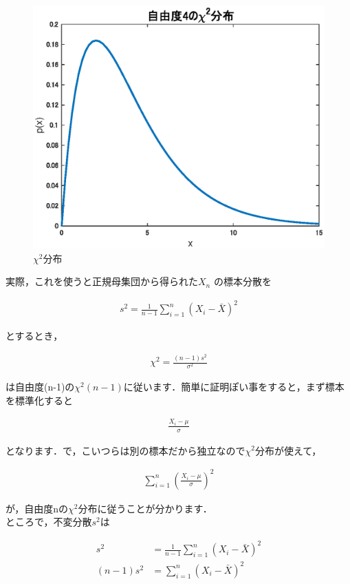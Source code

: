 \documentclass[11pt,a4paper]{ujreport} 	%
\begin{document}
\begin{figure}[H]
  \centering
  \includegraphics[width=12cm]{../figures/chi2.eps}
  \caption{$\chi^2$分布}
\end{figure}

実際，これを使うと正規母集団から得られた$X_n$
の標本分散を

\begin{align}
  s^2 = \frac{1}{n-1}\sum_{i=1}^n (X_i - \bar{X})^2
\end{align}

とするとき，

\begin{align}
  \chi^2 = \frac{(n-1)s^2}{\sigma^2}
\end{align}

は自由度(n-1)の$\chi^2(n-1)$に従います．簡単に証明ぽい事をすると，まず標本を標準化すると

\begin{align}
  \frac{X_i-\mu}{\sigma}
\end{align}

となります．で，こいつらは別の標本だから独立なので$\chi^2$分布が使えて，

\begin{align}
  \sum_{i=1}^n(\frac{X_i-\mu}{\sigma})^2
  \label{eq:normalgauss2}
\end{align}

が，自由度nの$\chi^2$分布に従うことが分かります．\\

ところで，不変分散$s^2$は

\begin{align}
  s^2 &= \frac{1}{n-1}\sum_{i=1}^n (X_i - \bar{X})^2\\
       (n-1)s^2 &= \sum_{i=1}^n (X_i - \bar{X})^2
      \label{eq:normalgauss1}
\end{align}
\end{document}
